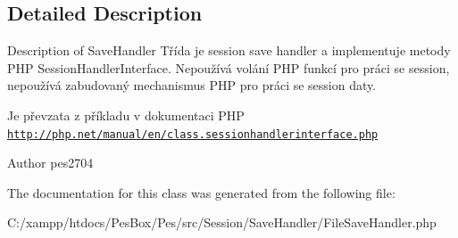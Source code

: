 \subsection{Detailed Description}
Description of Save\+Handler Třída je session save handler a implementuje metody P\+HP Session\+Handler\+Interface. Nepoužívá volání P\+HP funkcí pro práci se session, nepoužívá zabudovaný mechanismus P\+HP pro práci se session daty.

Je převzata z příkladu v dokumentaci P\+HP \href{http://php.net/manual/en/class.sessionhandlerinterface.php}{\tt http\+://php.\+net/manual/en/class.\+sessionhandlerinterface.\+php}

\begin{DoxyAuthor}{Author}
pes2704 
\end{DoxyAuthor}


The documentation for this class was generated from the following file\+:\begin{DoxyCompactItemize}
\item 
C\+:/xampp/htdocs/\+Pes\+Box/\+Pes/src/\+Session/\+Save\+Handler/File\+Save\+Handler.\+php\end{DoxyCompactItemize}

